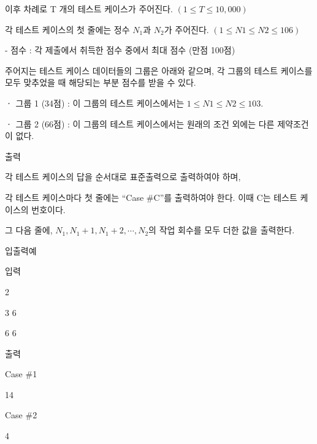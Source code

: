 \documentclass [12pt] {oblivoir}
\begin{document}
이후 차례로 T 개의 테스트 케이스가 주어진다. $(1 \le T \le 10,000)$

각 테스트 케이스의 첫 줄에는 정수 $N_{1}$과 $N_{2}$가 주어진다. $(1 \le N1 \le N2 \le 106)$

- 점수 : 각 제출에서 취득한 점수 중에서 최대 점수 (만점 100점)

   주어지는 테스트 케이스 데이터들의 그룹은 아래와 같으며, 각 그룹의 테스트 케이스를 모두 맞추었을 때 해당되는 부분 점수를 받을 수 있다.

ㆍ 그룹 1 (34점) : 이 그룹의 테스트 케이스에서는 $1 \le N1 \le N2 \le 103$.

ㆍ 그룹 2 (66점) : 이 그룹의 테스트 케이스에서는 원래의 조건 외에는 다른 제약조건이 없다.

출력

각 테스트 케이스의 답을 순서대로 표준출력으로 출력하여야 하며,

각 테스트 케이스마다 첫 줄에는 “Case \#C”를 출력하여야 한다. 이때 C는 테스트 케이스의 번호이다.

그 다음 줄에, $N_{1}, N_{1}+1, N_{1}+2, \cdots, N_{2}$의 작업 회수를 모두 더한 값을 출력한다.

입출력예

입력

2

3 6

6 6

출력

Case \#1

14

Case \#2

4
\end{document}
